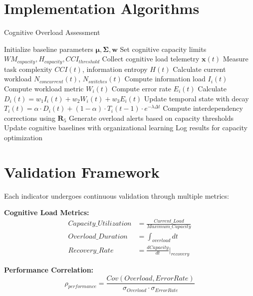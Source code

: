 \documentclass[11pt,a4paper]{article}
\begin{document}
\section{Implementation Algorithms}

\begin{algorithm}
\caption{Cognitive Overload Assessment}
\begin{algorithmic}[1]
\STATE Initialize baseline parameters $\boldsymbol{\mu}, \boldsymbol{\Sigma}, \boldsymbol{w}$
\STATE Set cognitive capacity limits $WM_{capacity}, H_{capacity}, CCI_{threshold}$
    \STATE Collect cognitive load telemetry $\mathbf{x}(t)$
    \STATE Measure task complexity $CCI(t)$, information entropy $H(t)$
    \STATE Calculate current workload $N_{concurrent}(t)$, $N_{switches}(t)$
        \STATE Compute information load $I_i(t)$
        \STATE Compute workload metric $W_i(t)$
        \STATE Compute error rate $E_i(t)$
        \STATE Calculate $D_i(t) = w_1 I_i(t) + w_2 W_i(t) + w_3 E_i(t)$
        \STATE Update temporal state with decay $T_i(t) = \alpha \cdot D_i(t) + (1-\alpha) \cdot T_i(t-1) \cdot e^{-\lambda \Delta t}$
    \ENDFOR
    \STATE Compute interdependency corrections using $\mathbf{R}_5$
    \STATE Generate overload alerts based on capacity thresholds
    \STATE Update cognitive baselines with organizational learning
    \STATE Log results for capacity optimization
\ENDFOR
\end{algorithmic}
\end{algorithm}

\section{Validation Framework}

Each indicator undergoes continuous validation through multiple metrics:

\textbf{Cognitive Load Metrics:}
\begin{align}
Capacity\_Utilization &= \frac{Current\_Load}{Maximum\_Capacity} \\
Overload\_Duration &= \int_{overload} dt \\
Recovery\_Rate &= \frac{dCapacity}{dt}|_{recovery}
\end{align}

\textbf{Performance Correlation:}
\begin{equation}
\rho_{performance} = \frac{Cov(Overload, ErrorRate)}{\sigma_{Overload} \cdot \sigma_{ErrorRate}}
\end{equation}
\end{document}
